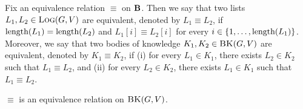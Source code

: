 \documentclass{article}
\begin{document}
Fix an equivalence relation $\equiv$ on $\text{\bf B}$. Then we say that two lists $L_1, L_2 \in \text{\sc Log}(G,V)$ are equivalent, denoted by $L_1 \equiv L_2$, if $\text{\rm length}(L_1) = \text{\rm length}(L_2)$ and $L_1[i] \equiv L_2[i]$ for every $i \in \{1, \ldots, \text{\rm length}(L_1)\}$. Moreover, we say that two bodies of knowledge $K_1, K_2 \in \text{\sc BK}(G,V)$ are equivalent, denoted by $K_1 \equiv K_2$, if (i) for every $L_1 \in K_1$, there exists $L_2 \in K_2$ such that $L_1 \equiv L_2$, and (ii) for every $L_2 \in K_2$, there exists $L_1 \in K_1$ such that $L_1 \equiv L_2$. 

\begin{mylem}
$\equiv$ is an equivalence relation on $\text{\sc BK}(G,V)$.
\end{mylem}

%
%


\end{document}
